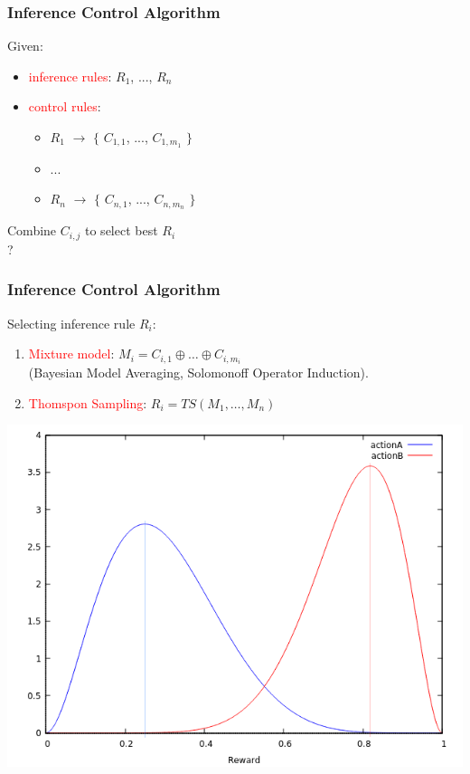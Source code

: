 \documentclass{beamer}
\begin{document}
\begin{frame}
  \frametitle{Inference Control Algorithm}

  Given:
  \begin{itemize}
  \item \textcolor{red}{inference rules}: $R_1$, ..., $R_n$
  \item \textcolor{red}{control rules}:
    \begin{itemize}
    \item $R_1$ $\rightarrow$ $\{$ $C_{1,1}$, ..., $C_{1,m_1}$ $\}$
    \item ...
    \item $R_n$ $\rightarrow$ $\{$ $C_{n,1}$, ..., $C_{n,m_n}$ $\}$
    \end{itemize}
  \end{itemize}

  \begin{center}
    \alert{Combine $C_{i,j}$ to select best $R_i$}\\
    ?
  \end{center}

\end{frame}

\begin{frame}
  \frametitle{Inference Control Algorithm}
  Selecting inference rule $R_i$:
  \begin{enumerate}
  \item \textcolor{red}{Mixture model}:
    $M_i = C_{i, 1} \oplus \dots \oplus C_{i, m_i}$\\
    (Bayesian Model Averaging, Solomonoff Operator Induction).
  \item \textcolor{red}{Thomspon Sampling}: $R_i = TS(M_1, \dots, M_n)$
  \end{enumerate}
  \begin{center}
    \includegraphics[scale=0.4]{ActionA_ActionB_lines_alpha.png}
  \end{center}

\end{frame}
\end{document}
